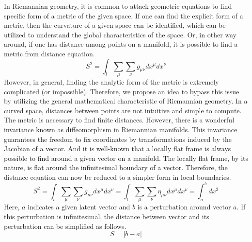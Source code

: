 In Riemannian geometry, it is common to attack geometric equations to find specific form of a metric of the given space. If one can find the explicit form of a metric, then the curvature of a given space can be identified, which can be utilized to understand the global characteristics of the space. Or, in other way around, if one has distance among points on a manifold, it is possible to find a metric from distance equation.
\begin{equation} \label{dist_curv}
    S^2 = \int_l \sum_\mu \sum_\nu g_{\mu\nu}dx^\mu dx^\nu
\end{equation}
However, in general, finding the analytic form of the metric is extremely complicated (or impossible). Therefore, we propose an idea to bypass this issue by utilizing the general mathematical characteristic of Riemannian geometry. In a curved space, distances between points are not intuitive and simple to compute. The metric is necessary to find finite distances. However, there is a wonderful invariance known as diffeomorphism in Riemannian manifolds. This invariance guarantees the freedom to fix coordinates by transformations induced by the Jacobian of a vector. And it is well-known that a locally flat frame is always possible to find around a given vector on a manifold. The locally flat frame, by its nature, is flat around the infinitesimal boundary of a vector. Therefore, the distance equation can now be reduced to a simpler form in local boundaries.
\begin{equation}
    S^2 = \int_l \sum_\mu \sum_\nu g_{\mu\nu}dx^\mu dx^\nu = \int_l \sum_\mu \sum_\nu \eta_{\mu\nu}dx^\mu dx^\nu = \int_a^b dx^2
\end{equation}
Here, $a$ indicates a given latent vector and $b$ is a perturbation around vector $a$. If this perturbation is infinitesimal, the distance between vector and its perturbation can be simplified as follows.
\begin{equation}
    S  =  |b - a|
\end{equation}

